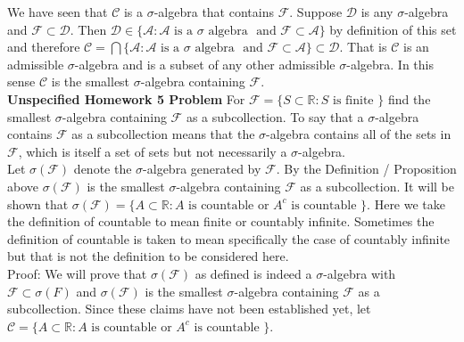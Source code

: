 \documentclass[a4paper]{article}
\begin{document}
We have seen that $\mathcal{C}$ is a $\sigma$-algebra that contains $\mathcal{F}$. Suppose $\mathcal{D}$ is any $\sigma$-algebra  and $\mathcal{F}\subset \mathcal{D}$. Then $\mathcal{D} \in \{\mathcal{A} : \mathcal{A} \text{ is a } \sigma \text{ algebra } \text{ and } \mathcal{F}\subset \mathcal{A}\}$ by definition of this set and therefore $\mathcal{C} = \bigcap \{\mathcal{A} : \mathcal{A} \text{ is a } \sigma \text{ algebra } \text{ and } \mathcal{F}\subset \mathcal{A}\} \subset \mathcal{D}$. That is $\mathcal{C}$ is an admissible $\sigma$-algebra and is a subset of any other admissible $\sigma$-algebra. In this sense $\mathcal{C}$ is the smallest $\sigma$-algebra containing $\mathcal{F}$.\\


{\bf Unspecified Homework 5 Problem} For $\mathcal{F} = \{S \subset \mathbb{R} : S \text{ is finite }\}$ find the smallest $\sigma$-algebra containing $\mathcal{F}$ as a subcollection. To say that a $\sigma$-algebra contains $\mathcal{F}$ as a subcollection means that the $\sigma$-algebra contains all of the sets in $\mathcal{F}$, which is itself a set of sets but not necessarily a $\sigma$-algebra. \\

Let $\sigma(\mathcal{F})$ denote the $\sigma$-algebra generated by $\mathcal{F}$. By the Definition / Proposition above $\sigma(\mathcal{F})$ is the smallest $\sigma$-algebra containing $\mathcal{F}$ as a subcollection. It will be shown that $\sigma(\mathcal{F}) = \{A \subset \mathbb{R} : A \text{ is countable or } A^c \text{ is countable }\}$. Here we take the definition of countable to mean finite or countably infinite. Sometimes the definition of countable is taken to mean specifically the case of countably infinite but that is not the definition to be considered here.\\

Proof: We will prove that $\sigma(\mathcal{F})$ as defined is indeed a $\sigma$-algebra with $\mathcal{F} \subset\sigma(F)$ and $\sigma(\mathcal{F})$ is the smallest $\sigma$-algebra containing $\mathcal{F}$ as a subcollection. Since these claims have not been established yet, let $\mathcal{C} = \{A \subset \mathbb{R} : A \text{ is countable or } A^c \text{ is countable }\}$.\\
\end{document}
